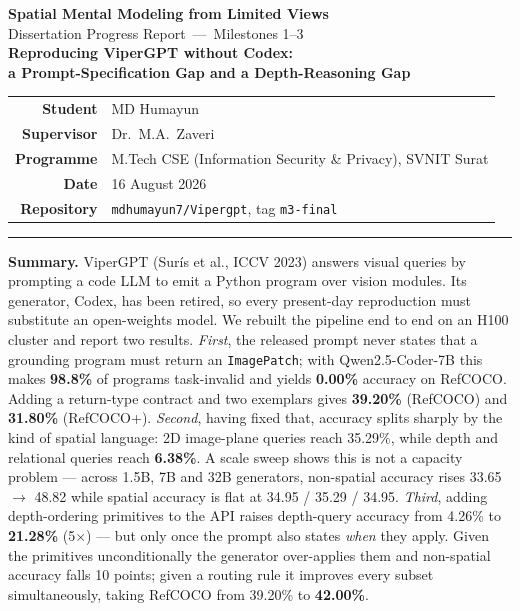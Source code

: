 \documentclass[11pt,a4paper]{article}
\newcommand{\up}[1]{\textcolor{good}{\textbf{#1}}}
\newcommand{\down}[1]{\textcolor{bad}{\textbf{#1}}}
\begin{document}
\begin{center}
{\LARGE\bfseries\color{navy} Spatial Mental Modeling from Limited Views}\\[4pt]
{\large Dissertation Progress Report~---~Milestones 1--3}\\[10pt]
{\large\bfseries Reproducing ViperGPT without Codex:}\\[2pt]
{\large\bfseries a Prompt-Specification Gap and a Depth-Reasoning Gap}\\[13pt]
\begin{tabular}{rl}
\textbf{Student} & MD Humayun \\
\textbf{Supervisor} & Dr.\ M.A.\ Zaveri \\
\textbf{Programme} & M.Tech CSE (Information Security \& Privacy), SVNIT Surat \\
\textbf{Date} & 16 August 2026 \\
\textbf{Repository} & \texttt{mdhumayun7/Vipergpt}, tag \texttt{m3-final} \\
\end{tabular}
\end{center}
\vspace{4pt}\hrule\vspace{9pt}

\begin{center}\begin{minipage}{0.93\textwidth}\small
\textbf{Summary.}\; ViperGPT (Sur\'is et al., ICCV 2023) answers visual queries by
prompting a code LLM to emit a Python program over vision modules. Its generator,
Codex, has been retired, so every present-day reproduction must substitute an
open-weights model. We rebuilt the pipeline end to end on an H100 cluster and report
two results. \emph{First}, the released prompt never states that a grounding program
must return an \texttt{ImagePatch}; with Qwen2.5-Coder-7B this makes \down{98.8\%} of
programs task-invalid and yields \down{0.00\%} accuracy on RefCOCO. Adding a
return-type contract and two exemplars gives \up{39.20\%} (RefCOCO) and \up{31.80\%}
(RefCOCO+). \emph{Second}, having fixed that, accuracy splits sharply by the kind of
spatial language: 2D image-plane queries reach 35.29\%, while depth and relational
queries reach \down{6.38\%}. A scale sweep shows this is not a capacity problem ---
across 1.5B, 7B and 32B generators, non-spatial accuracy rises 33.65 $\to$ 48.82
while spatial accuracy is flat at 34.95 / 35.29 / 34.95. \emph{Third}, adding depth-ordering
primitives to the API raises depth-query accuracy from 4.26\% to \up{21.28\%}
(5$\times$) --- but only once the prompt also states \emph{when} they apply. Given the
primitives unconditionally the generator over-applies them and non-spatial accuracy
falls 10 points; given a routing rule it improves every subset simultaneously, taking
RefCOCO from 39.20\% to \up{42.00\%}.
\end{minipage}\end{center}
\vspace{6pt}
\end{document}
